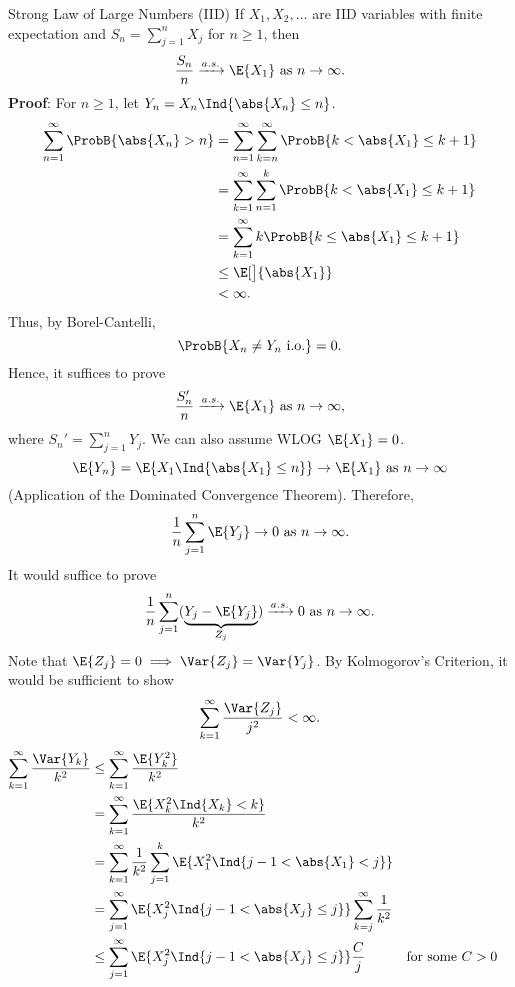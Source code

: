 \begin{Theorem}{Strong Law of Large Numbers (IID)}{}
    If $ X_1,X_2,\ldots $ are IID variables with finite expectation
    and $ S_n=\sum_{j=1}^{n}X_j $ for $ n\ge 1 $, then
    \[ \frac{S_n}{n}\as \E{X_1}\text{ as }n\to\infty. \]
    \tcblower{}
    \textbf{Proof}: For $ n\ge 1 $, let
    $ Y_n=X_n\Ind{\abs{X_n}\le n} $.
    \begin{align*}
        \sum_{n=1}^{\infty}\ProbB{\abs{X_n}>n}
         & =\sum_{n=1}^{\infty}\sum_{k=n}^{\infty}\ProbB{k<\abs{X_1}\le k+1} \\
         & =\sum_{k=1}^{\infty}\sum_{n=1}^{k}\ProbB{k<\abs{X_1}\le k+1}      \\
         & =\sum_{k=1}^{\infty}k\ProbB{k\le \abs{X_1}\le k+1}                \\
         & \le \E[\big]{\abs{X_1}}                                           \\
         & <\infty.
    \end{align*}
    Thus, by Borel-Cantelli,
    \[ \ProbB{X_n\ne Y_n\text{ i.o.}}=0. \]
    Hence, it suffices to prove
    \[ \frac{S_n'}{n}\as \E{X_1}\text{ as }n\to\infty, \]
    where $ S_n'=\sum_{j=1}^{n}Y_j $. We can also assume WLOG
    $ \E{X_1}=0 $.
    \[ \E{Y_n}=\E{X_1\Ind{\abs{X_1}\le n}}\to \E{X_1}\text{ as }n\to\infty \]
    (Application of the Dominated Convergence Theorem). Therefore,
    \[ \frac{1}{n}\sum_{j=1}^{n}\E{Y_j}\to 0\text{ as }n\to\infty. \]
    It would suffice to prove
    \[ \frac{1}{n}\sum_{j=1}^{n}(\underbrace{Y_j-\E{Y_j}}_{Z_j})\as 0\text{ as }n\to\infty. \]
    Note that $ \E{Z_j}=0\implies \Var{Z_j}=\Var{Y_j} $.
    By Kolmogorov's Criterion, it would be sufficient to show
    \[ \sum_{k=1}^{\infty}\frac{\Var{Z_j}}{j^2}<\infty. \]
    \begin{align*}
        \sum_{k=1}^{\infty}\frac{\Var{Y_k}}{k^2}
         & \le \sum_{k=1}^{\infty}\frac{\E{Y_k^2}}{k^2}                                                                   \\
         & =\sum_{k=1}^{\infty}\frac{\E{X_k^2\Ind{X_k}<k}}{k^2}                                                           \\
         & =\sum_{k=1}^{\infty}\frac{1}{k^2}\sum_{j=1}^{k}\E{X_1^2\Ind{j-1<\abs{X_1}<j}}                                  \\
         & =\sum_{j=1}^{\infty}\E{X_j^2\Ind{j-1<\abs{X_j}\le j}}\sum_{k=j}^{\infty}\frac{1}{k^2}                          \\
         & \le \sum_{j=1}^{\infty}\E{X_j^2\Ind{j-1<\abs{X_j}\le j}} \frac{C}{j}                  &  & \text{for some }C>0 \\

\end{align*}
\end{Theorem}
